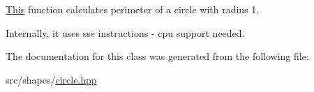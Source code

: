 \mbox{\hyperlink{classThis}{This}} function calculates perimeter of a circle with radius 1. 

Internally, it uses sse instructions -\/ cpu support needed. 

The documentation for this class was generated from the following file\+:\begin{DoxyCompactItemize}
\item 
src/shapes/\mbox{\hyperlink{circle_8hpp}{circle.\+hpp}}\end{DoxyCompactItemize}
